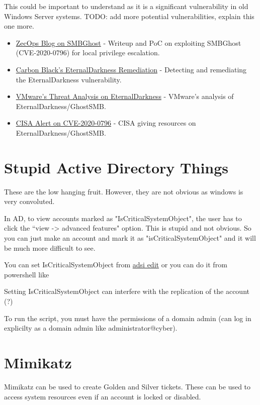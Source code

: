 \documentclass{article}
\begin{document}
This could be important to understand as it is a significant vulnerability in old Windows Server systems.
TODO: add more potential vulnerabilities, explain this one more.

\begin{itemize}
    \item \href{https://blog.zecops.com/research/exploiting-smbghost-cve-2020-0796-for-a-local-privilege-escalation-writeup-and-poc/}{ZecOps Blog on SMBGhost} - Writeup and PoC on exploiting SMBGhost (CVE-2020-0796) for local privilege escalation.
    \item \href{https://github.com/carbonblack/tau-tools/tree/master/remediation/EternalDarkness}{Carbon Black's EternalDarkness Remediation} - Detecting and remediating the EternalDarkness vulnerability.
    \item \href{https://blogs.vmware.com/security/2020/03/threat-analysis-cve-2020-0796-eternaldarkness-ghostsmb.html}{VMware's Threat Analysis on EternalDarkness} - VMware's analysis of EternalDarkness/GhostSMB.
    \item \href{https://www.cisa.gov/news-events/alerts/2020/06/05/unpatched-microsoft-systems-vulnerable-cve-2020-0796}{CISA Alert on CVE-2020-0796} - CISA giving resources on EternalDarkness/GhostSMB.    
\end{itemize}

\section{Stupid Active Directory Things}
These are the low hanging fruit. 
However, they are not obvious as windows is very convoluted.

In AD, to view accounts marked as "IsCriticalSystemObject", the user has to 
click the ``view -> advanced features" option. This is stupid and not obvious.
So you can just make an account and mark it as "isCriticalSystemObject"
and it will be much more difficult to see.

You can set IsCriticalSystemObject from \href{https://theitbros.com/adsi-edit/}{adsi edit}
or you can do it from powershell like 

Setting IsCriticalSystemObject can interfere with the replication of the account (?)

To run the script, you must have the permissions of a domain admin (can log in explicilty as a domain
admin like administrator@cyber).
\section{Mimikatz}
Mimikatz can be used to create Golden and Silver tickets.
These can be used to access system resources even if an account is locked or disabled.
\end{document}
